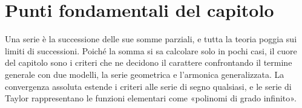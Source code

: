 \section{Punti fondamentali del capitolo}
\label{sec:sintesi-cap11}

Una serie è la successione delle sue somme parziali, e tutta la teoria poggia sui limiti
di successioni. Poiché la somma si sa calcolare solo in pochi casi, il cuore del capitolo
sono i criteri che ne decidono il carattere confrontando il termine generale con due
modelli, la serie geometrica e l'armonica generalizzata. La convergenza assoluta estende
i criteri alle serie di segno qualsiasi, e le serie di Taylor rappresentano le funzioni
elementari come «polinomi di grado infinito».

